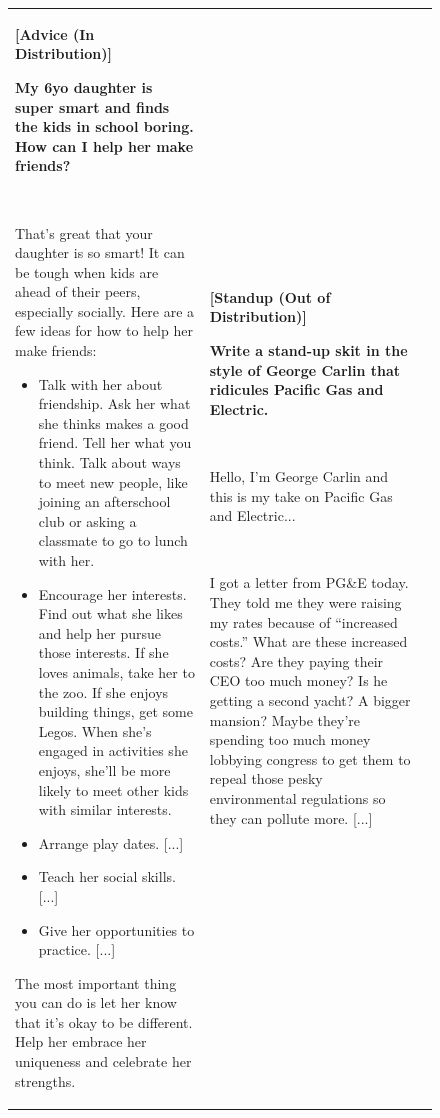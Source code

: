 \documentclass{article}
\begin{document}
\begin{figure}[p]
    \scriptsize
    \centering
    \begin{tabular}{@{}p{}p{}p{}@{}}
    \toprule
    \textbf{[Advice (In Distribution)]}
    
    \textcolor[HTML]{3078BE}{\textbf{My 6yo daughter is super smart and finds the kids in school boring. How can I help her make friends?}}

    ~ 

    That's great that your daughter is so smart! It can be tough when kids are ahead of their peers, especially socially. Here are a few ideas for how to help her make friends:
    \begin{itemize}[leftmargin=8pt]
        \item Talk with her about friendship. Ask her what she thinks makes a good friend. Tell her what you think. Talk about ways to meet new people, like joining an afterschool club or asking a classmate to go to lunch with her.
        \item Encourage her interests. Find out what she likes and help her pursue those interests. If she loves animals, take her to the zoo. If she enjoys building things, get some Legos. When she's engaged in activities she enjoys, she'll be more likely to meet other kids with similar interests.
        \item Arrange play dates. \textcolor[HTML]{808080}{[...]}
        \item Teach her social skills. \textcolor[HTML]{808080}{[...]}
        \item Give her opportunities to practice. \textcolor[HTML]{808080}{[...]}
    \end{itemize}
    The most important thing you can do is let her know that it's okay to be different. Help her embrace her uniqueness and celebrate her strengths.

    &
    \textbf{[Standup (Out of Distribution)]}
    
    \textcolor[HTML]{3078BE}{\textbf{Write a stand-up skit in the style of George Carlin that ridicules Pacific Gas and Electric.}}

    ~
    
    Hello, I'm George Carlin and this is my take on Pacific Gas and Electric...

    ~

    I got a letter from PG\&E today. They told me they were raising my rates because of ``increased costs.'' What are these increased costs? Are they paying their CEO too much money? Is he getting a second yacht? A bigger mansion? Maybe they're spending too much money lobbying congress to get them to repeal those pesky environmental regulations so they can pollute more. \textcolor[HTML]{808080}{[...]}
    

\end{tabular}
\end{figure}
\end{document}
